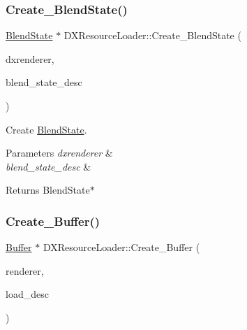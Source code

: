 \subsubsection{\texorpdfstring{Create\+\_\+\+Blend\+State()}{Create\_BlendState()}}
{\footnotesize\ttfamily \hyperlink{classBlendState}{Blend\+State} $\ast$ D\+X\+Resource\+Loader\+::\+Create\+\_\+\+Blend\+State (\begin{DoxyParamCaption}\item[{\hyperlink{classDXRenderer}{D\+X\+Renderer} $\ast$}]{dxrenderer,  }\item[{const \hyperlink{structBlendStateDesc}{Blend\+State\+Desc} \&}]{blend\+\_\+state\+\_\+desc }\end{DoxyParamCaption})\hspace{0.3cm}{\ttfamily [static]}}



Create \hyperlink{classBlendState}{Blend\+State}. 


\begin{DoxyParams}{Parameters}
{\em dxrenderer} & \\
\hline
{\em blend\+\_\+state\+\_\+desc} & \\
\hline
\end{DoxyParams}
\begin{DoxyReturn}{Returns}
Blend\+State$\ast$ 
\end{DoxyReturn}
\mbox{\label{classDXResourceLoader_a771cd595ba597d3e048e5d7120d1c0ef}} 
\subsubsection{\texorpdfstring{Create\+\_\+\+Buffer()}{Create\_Buffer()}}
{\footnotesize\ttfamily \hyperlink{classBuffer}{Buffer} $\ast$ D\+X\+Resource\+Loader\+::\+Create\+\_\+\+Buffer (\begin{DoxyParamCaption}\item[{\hyperlink{classDXRenderer}{D\+X\+Renderer} $\ast$}]{renderer,  }\item[{\hyperlink{structBufferLoadDesc}{Buffer\+Load\+Desc} \&}]{load\+\_\+desc }\end{DoxyParamCaption})\hspace{0.3cm}{\ttfamily [static]}}



